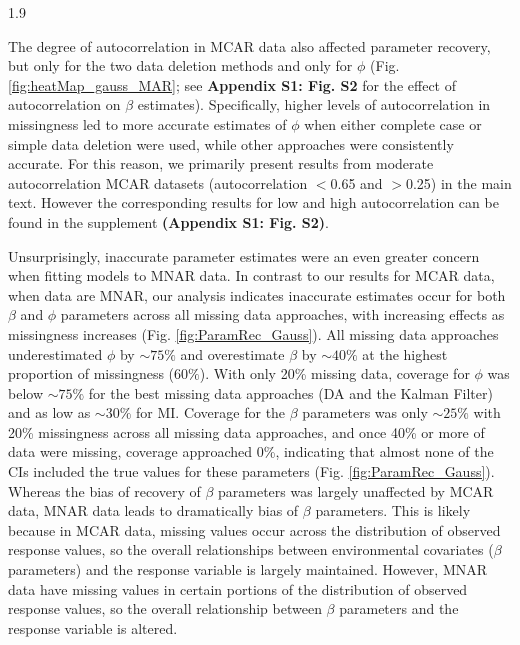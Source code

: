 \documentclass[12pt,english]{article} %
\begin{document}
\begin{linenumbers}
\begin{spacing}{1.9}
\begin{flushleft}
\hspace{1em} The degree of autocorrelation in MCAR data also affected parameter recovery, but only for the two data deletion methods and only for $\phi$ (Fig. \ref{fig:heatMap_gauss_MAR}; see \textbf{Appendix S1: Fig. S2} for the effect of autocorrelation on $\beta$ estimates). Specifically, higher levels of autocorrelation in missingness led to more accurate estimates of $\phi$ when either complete case or simple data deletion were used, while other approaches were consistently accurate. For this reason, we primarily present results from moderate autocorrelation MCAR datasets (autocorrelation $<$0.65 and $>$0.25) in the main text. However the corresponding results for low and high autocorrelation can be found in the supplement \textbf{(Appendix S1: Fig. S2)}.

\hspace{1em} Unsurprisingly, inaccurate parameter estimates were an even greater concern when fitting models to MNAR data.  In contrast to our results for MCAR data, when data are MNAR, our analysis indicates inaccurate estimates occur for both $\beta$ and $\phi$ parameters across all missing data approaches, with increasing effects as missingness increases (Fig. \ref{fig:ParamRec_Gauss}). All missing data approaches underestimated $\phi$ by $\sim75\%$ and overestimate $\beta$ by $\sim40\%$ at the highest proportion of missingness ($60\%$). With only 20\% missing data, coverage for $\phi$ was below $\sim75\%$ for the best missing data approaches (DA and the Kalman Filter) and as low as $\sim30\%$ for MI. Coverage for the $\beta$ parameters was only $\sim25\%$ with 20\% missingness across all missing data approaches, and once 40\% or more of data were missing, coverage approached 0\%, indicating that almost none of the CIs included the true values for these parameters (Fig. \ref{fig:ParamRec_Gauss}). Whereas the bias of recovery of $\beta$ parameters was largely unaffected by MCAR data, MNAR data leads to dramatically bias of $\beta$ parameters. This is likely because in MCAR data, missing values occur across the distribution of observed response values, so the overall relationships between environmental covariates ($\beta$ parameters) and the response variable is largely maintained. However, MNAR data have missing values in certain portions of the distribution of observed response values, so the overall relationship between $\beta$ parameters and the response variable is altered.


\end{flushleft}
\end{spacing}
\end{linenumbers}
\end{document}
